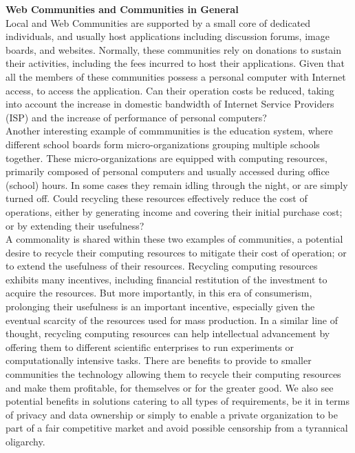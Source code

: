\documentclass[12pt, titlepage]{uo_temp}
\begin{document}
     \textbf{Web Communities and Communities in General}\\
     Local and Web Communities are supported by a small core of dedicated individuals, and
     usually host applications including discussion forums, image boards, and
     websites. Normally, these communities rely on donations to sustain their activities,
     including the fees incurred to host their applications. Given that all the members of
     these communities possess a personal computer with Internet access, to access the
     application. Can their operation costs be reduced, taking into account the increase
     in domestic bandwidth of Internet Service Providers (ISP) and the increase of
     performance of personal computers?
     \\

     Another interesting example of commmunities is the education system, where different
     school boards form micro-organizations grouping multiple schools together.  These
     micro-organizations are equipped with computing resources, primarily composed of
     personal computers and usually accessed during office (school) hours. In some cases
     they remain idling through the night, or are simply turned off. Could recycling these
     resources effectively reduce the cost of operations, either by generating income and
     covering their initial purchase cost; or by extending their usefulness?
     \\

     A commonality is shared within these two examples of communities, a potential desire to
     recycle their computing resources to mitigate their cost of operation; or to extend the
     usefulness of their resources.
     Recycling computing resources exhibits many incentives, including financial
     restitution of the investment to acquire the resources. But more importantly, in this
     era of consumerism, prolonging their usefulness is an important incentive, especially
     given the eventual scarcity of the resources used for mass production. In a similar
     line of thought, recycling computing resources can help intellectual advancement by
     offering them to different scientific enterprises to run experiments or
     computationally intensive tasks. There are benefits to provide to smaller communities
     the technology allowing them to recycle their computing resources and make them
     profitable, for themselves or for the greater good.  We also see potential benefits in
     solutions catering to all types of requirements, be it in terms of privacy and data
     ownership or simply to enable a private organization to be part of a fair competitive
     market and avoid possible censorship from a tyrannical oligarchy.
\end{document}
